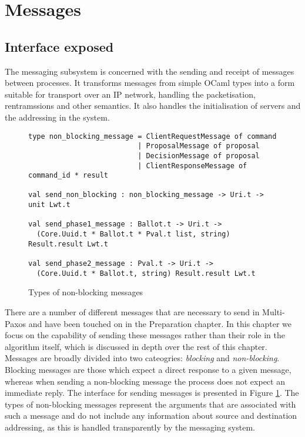 \section{Messages}

\subsection{Interface exposed}

The messaging subsystem is concerned with the sending and receipt of messages between processes. It transforms messages from simple OCaml types into a form suitable for transport over an IP network, handling the packetisation, rentramssions and other semantics. It also handles the initialisation of servers and the addressing in the system. \\

\begin{figure}
  \begin{lstlisting}
type non_blocking_message = ClientRequestMessage of command
                          | ProposalMessage of proposal
                          | DecisionMessage of proposal
                          | ClientResponseMessage of command_id * result
                          
val send_non_blocking : non_blocking_message -> Uri.t -> unit Lwt.t

val send_phase1_message : Ballot.t -> Uri.t -> 
  (Core.Uuid.t * Ballot.t * Pval.t list, string) Result.result Lwt.t
    
val send_phase2_message : Pval.t -> Uri.t -> 
  (Core.Uuid.t * Ballot.t, string) Result.result Lwt.t
  \end{lstlisting}
  \centering
  \caption{Types of non-blocking messages}
  \label{message-types}
\end{figure}

There are a number of different messages that are necessary to send in Multi-Paxos and have been touched on in the Preparation chapter. In this chapter we focus on the capability of sending these messages rather than their role in the algorithm itself, which is discussed in depth over the rest of this chapter. \\

Messages are broadly divided into two cateogries: \emph{blocking} and \emph{non-blocking}. Blocking messages are those which expect a direct response to a given message, whereas when sending a non-blocking message the process does not expect an immediate reply. The interface for sending messages is presented in Figure \ref{message-types}. The types of non-blocking messages represent the arguments that are associated with such a message and do not include any information about source and destination addressing, as this is handled transparently by the messaging system. \\

